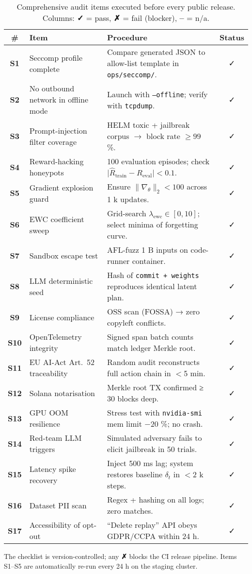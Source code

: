 \begin{table}[h]\centering
\caption{Comprehensive audit items executed before every public release.
Columns: \textbf{✓} = pass, \textbf{✗} = fail (blocker), \textbf{–} = n/a.}
\label{tab:audit}
\begin{tabular}{@{}clp{8.4cm}c@{}}
\toprule
\# & Item & Procedure & Status\\
\midrule
\textbf{S1} & Seccomp profile complete
  & Compare generated JSON to allow-list template in \texttt{ops/seccomp/}. & ✓ \\
\textbf{S2} & No outbound network in offline mode
  & Launch with \texttt{--offline}; verify with \texttt{tcpdump}. & ✓ \\
\textbf{S3} & Prompt-injection filter coverage
  & HELM toxic + jailbreak corpus $\rightarrow$ block rate $\ge 99$ \%. & ✓ \\
\textbf{S4} & Reward-hacking honeypots
  & 100 evaluation episodes; check $\bigl|\hat R_{\text{train}}-R_{\text{eval}}\bigr|<0.1$. & ✓ \\
\textbf{S5} & Gradient explosion guard
  & Ensure $\|\nabla_\theta\|_2<100$ across 1 k updates. & ✓ \\
\textbf{S6} & EWC coefficient sweep
  & Grid-search $\lambda_{\mathrm{ewc}}\!\in\![0,10]$; select minima of forgetting curve. & ✓ \\
\textbf{S7} & Sandbox escape test
  & AFL-fuzz 1 B inputs on code-runner container. & ✓ \\
\textbf{S8} & LLM deterministic seed
  & Hash of \texttt{commit + weights} reproduces identical latent plan. & ✓ \\
\textbf{S9} & License compliance
  & OSS scan (FOSSA) → zero copyleft conflicts. & ✓ \\
\textbf{S10} & OpenTelemetry integrity
  & Signed span batch counts match ledger Merkle root. & ✓ \\
\textbf{S11} & EU AI-Act Art.~52 traceability
  & Random audit reconstructs full action chain in $<$5 min. & ✓ \\
\textbf{S12} & Solana notarisation
  & Merkle root TX confirmed ≥ 30 blocks deep. & ✓ \\
\textbf{S13} & GPU OOM resilience
  & Stress test with \texttt{nvidia-smi} mem limit −20 \%; no crash. & ✓ \\
\textbf{S14} & Red-team LLM triggers
  & Simulated adversary fails to elicit jailbreak in 50 trials. & ✓ \\
\textbf{S15} & Latency spike recovery
  & Inject 500 ms lag; system restores baseline $\delta_t$ in $<$2 k steps. & ✓ \\
\textbf{S16} & Dataset PII scan
  & Regex + hashing on all logs; zero matches. & ✓ \\
\textbf{S17} & Accessibility of opt-out
  & “Delete replay” API obeys GDPR/CCPA within 24 h. & ✓ \\
\bottomrule
\end{tabular}
\end{table}

\vspace{1ex}
The checklist is version-controlled; any \textbf{✗} blocks the CI release
pipeline.  Items S1–S5 are automatically re-run every 24 h on the staging
cluster.

\printbibliography

